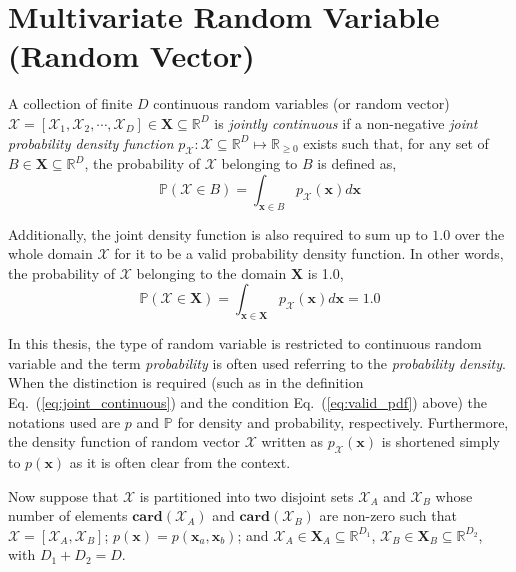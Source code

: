 \section{Multivariate Random Variable (Random Vector)}\label{app:probability}

A collection of finite $D$ continuous random variables (or random vector) $\bm{\mathcal{X}} = [\mathcal{X}_1, \mathcal{X}_2, \cdots, \mathcal{X}_D] \in \boldsymbol{X} \subseteq \mathbb{R}^D$ is \emph{jointly continuous} if a non-negative \emph{joint probability density function} $p_{\bm{\mathcal{X}}}: \bm{\mathcal{X}} \subseteq \mathbb{R}^D \mapsto \mathbb{R}_{\geq 0}$ exists such that, for any set of $B \in \boldsymbol{X} \subseteq \mathbb{R}^D$, the probability of $\bm{\mathcal{X}}$ belonging to $B$ is defined as,
\begin{equation}
  \mathbb{P} (\bm{\mathcal{X}} \in B) = \int_{\bm{x} \in B} p_{\bm{\mathcal{X}}} (\bm{x}) d\bm{x}
\label{eq:joint_continuous}
\end{equation}

Additionally,
the joint density function is also required to sum up to $1.0$ over the whole domain $\bm{\mathcal{X}}$ for it to be a valid probability density function.
In other words, the probability of $\bm{\mathcal{X}}$ belonging to the domain $\boldsymbol{X}$ is 1.0,
\begin{equation}
  \mathbb{P} (\bm{\mathcal{X}} \in \boldsymbol{X}) = \int_{\bm{x} \in \boldsymbol{X}} p_{\bm{\mathcal{X}}} (\bm{x}) d\bm{x} = 1.0
\label{eq:valid_pdf}
\end{equation}

In this thesis,
the type of random variable is restricted to continuous random variable and the term \emph{probability} is often used referring to the \emph{probability density}.
When the distinction is required (such as in the definition Eq.~(\ref{eq:joint_continuous}) and the condition Eq.~(\ref{eq:valid_pdf}) above) the notations used are $p$ and $\mathbb{P}$ for density and probability, respectively.
Furthermore, the density function of random vector $\bm{\mathcal{X}}$ written as $p_{\bm{\mathcal{X}}} (\bm{x})$ is shortened simply to $p (\bm{x})$ as it is often clear from the context.

Now suppose that $\bm{\mathcal{X}}$ is partitioned into two disjoint sets $\bm{\mathcal{X}}_A$ and $\bm{\mathcal{X}}_B$ whose number of elements $\mathbf{card}(\bm{\mathcal{X}}_A)$ and $\mathbf{card}(\bm{\mathcal{X}}_B)$ are non-zero such that $\bm{\mathcal{X}} = [\bm{\mathcal{X}}_A, \bm{\mathcal{X}}_B]$; 
$p(\bm{x}) = p(\bm{x}_a,\bm{x}_b)$; 
and $\bm{\mathcal{X}}_A \in \boldsymbol{X}_A \subseteq \mathbb{R}^{D_1}$, $\bm{\mathcal{X}}_B \in \boldsymbol{X}_B \subseteq \mathbb{R}^{D_2}$, with $D_1 + D_2 = D$.
  
